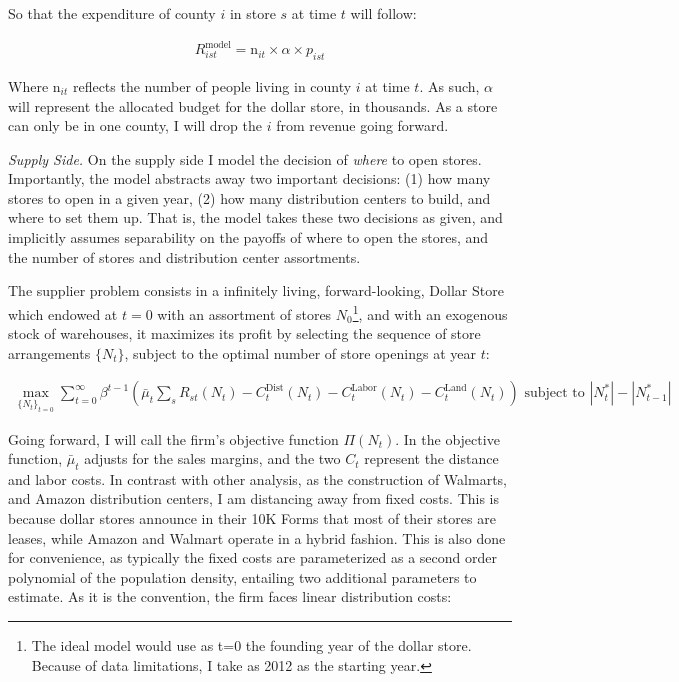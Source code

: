 \documentclass[11.5pt]{article}
\begin{document}
So that the expenditure of county $i$ in store $s$ at time $t$ will follow:

\begin{align}
     R_{ist}^\text{model}= \text{n}_{it} \times  \alpha \times  p_{ist} 
\end{align}

Where $\text{n}_{it}$ reflects the number of people living in county $i$ at time $t$. As such, $\alpha$ will represent the allocated budget for the dollar store, in thousands. As a store can only be in one county, I will drop the $i$ from revenue going forward. 





\textit{Supply Side.} On the supply side I model the decision of \textit{where} to open stores. Importantly, the model abstracts away two important decisions: (1) how many stores to open in a given year, (2) how many distribution centers to build, and where to set them up. That is, the model takes these two decisions as given, and implicitly assumes separability on the payoffs of where to open the stores, and the number of stores and distribution center assortments. 


The supplier problem consists in a infinitely living, forward-looking, {Dollar Store} which endowed at $t=0$ with an assortment of stores $N_0$\footnote{The ideal model would use as t=0 the founding year of the dollar store. Because of data limitations, I take as 2012 as the starting year.}, and with an exogenous stock of warehouses, it maximizes its profit by selecting the sequence of store arrangements $\{N_t\}$, subject to the optimal number of store openings at year $t$:


\begin{align}
    \max_{\{N_t\}_{t=0}}\sum_{t=0}^\infty \beta^{t-1} \left(\bar \mu_t\sum_{s}   R_{st}(N_t) - C_t^\text{Dist}(N_t) - C_t^\text{Labor} (N_t) - C_t^\text{Land} (N_t) \right) \text{ subject to }  |N_t^*|-|N_{t-1}^*| 
\end{align}

 
 Going forward, I will call the firm's objective function $\Pi(N_t)$. In the objective function, $\bar \mu_t$ adjusts for the sales margins, and the two $C_t$ represent the distance and labor costs. In contrast with other analysis, as the construction of Walmarts, and Amazon distribution centers, I am distancing away from fixed costs. This is because dollar stores announce in their 10K Forms that most of their stores are leases, while Amazon and Walmart operate in a hybrid fashion. This is also done for convenience, as typically  the fixed costs are parameterized as a second order polynomial of the population density, entailing two additional parameters to estimate. As it is the convention, the firm faces linear distribution costs:
\end{document}
